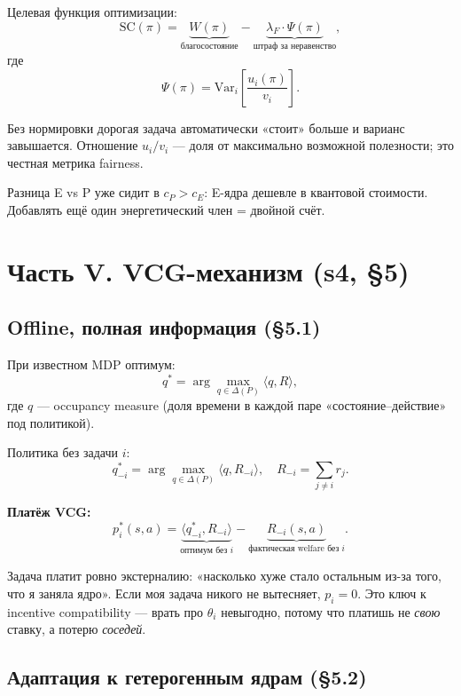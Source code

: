 \documentclass[11pt,a4paper]{article}
\begin{document}
Целевая функция оптимизации:
\[
\mathrm{SC}(\pi) = \underbrace{W(\pi)}_{\text{благосостояние}}
- \underbrace{\lambda_F\cdot\Psi(\pi)}_{\text{штраф за неравенство}},
\]
где
\[
\Psi(\pi) = \mathrm{Var}_i\!\left[\frac{u_i(\pi)}{v_i}\right].
\]

\begin{why}
Без нормировки дорогая задача автоматически «стоит» больше и
варианс завышается. Отношение $u_i/v_i$ — доля от максимально
возможной полезности; это честная метрика fairness.
\end{why}

\begin{why}
Разница E vs P уже сидит в $c_P>c_E$: E-ядра дешевле в квантовой
стоимости. Добавлять ещё один энергетический член = двойной счёт.
\end{why}

\section{Часть V. VCG-механизм (s4, §5)}

\subsection{Offline, полная информация (§5.1)}

При известном MDP оптимум:
\[
q^* = \arg\max_{q\in\Delta(P)} \langle q, R\rangle,
\]
где $q$ — occupancy measure (доля времени в каждой паре
«состояние--действие» под политикой).

Политика без задачи $i$:
\[
q^*_{-i} = \arg\max_{q\in\Delta(P)} \langle q, R_{-i}\rangle,\quad
R_{-i}=\sum_{j\neq i} r_j.
\]

\textbf{Платёж VCG:}
\[
p_i^*(s,a) =
\underbrace{\langle q^*_{-i}, R_{-i}\rangle}_{\text{оптимум без } i}
- \underbrace{R_{-i}(s,a)}_{\text{фактическая welfare без } i}.
\]

\begin{why}
Задача платит ровно экстерналию: «насколько хуже стало остальным
из-за того, что я заняла ядро». Если моя задача никого не вытесняет,
$p_i=0$. Это ключ к incentive compatibility — врать про $\theta_i$
невыгодно, потому что платишь не \emph{свою} ставку, а потерю
\emph{соседей}.
\end{why}

\subsection{Адаптация к гетерогенным ядрам (§5.2)}
\end{document}
